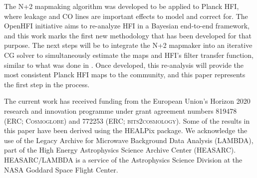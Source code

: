 \documentclass{aa}
\begin{document}
The N+2 mapmaking algorithm was developed to be applied to Planck HFI, where leakage and CO lines are important effects to model and correct for. The OpenHFI initiative aims to re-analyze HFI in a Bayesian end-to-end framework, and this work marks the first new methodology that has been developed for that purpose. The next steps will be to integrate the N+2 mapmaker into an iterative CG solver to simultaneously estimate the maps and HFI's filter transfer function, similar to what was done in \cite{artem}. Once developed, this re-analysis will provide the most consistent Planck HFI maps to the community, and this paper represents the first step in the process.

\begin{acknowledgements}
 The current work has received funding from the European
  Union’s Horizon 2020 research and innovation programme under grant
  agreement numbers 819478 (ERC; \textsc{Cosmoglobe}) and 772253 (ERC;
  \textsc{bits2cosmology}). Some of the results in this paper have been derived using the HEALPix \citep{healpix} package.
  We acknowledge the use of the Legacy Archive for Microwave Background Data
  Analysis (LAMBDA), part of the High Energy Astrophysics Science Archive Center
  (HEASARC). HEASARC/LAMBDA is a service of the Astrophysics Science Division at
  the NASA Goddard Space Flight Center.  
\end{acknowledgements}


%



\end{document}
